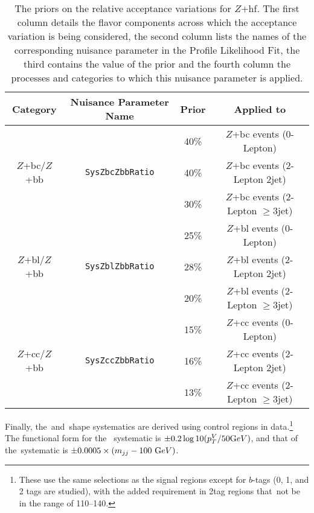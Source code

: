 \begin{table}[!htbp]\captionsetup{justification=centering}
\caption{The priors on the relative acceptance variations for $Z$+hf. The first column details the flavor components across which the acceptance variation is being considered, the second column lists the names of the corresponding nuisance parameter in the Profile Likelihood Fit, the third contains the value of the prior and the fourth column the processes and categories to which this nuisance parameter is applied.}
\begin{center}
\begin{tabular}{c|c|c|c}
        \hline
        \hline
         Category & Nuisance Parameter Name & Prior & Applied to\\ 
        \hline
        \multirow{ 3}{*}{$Z$+bc/$Z$+bb} & \multirow{ 3}{*}{\texttt{SysZbcZbbRatio}}  & 40\% & $Z$+bc events (0-Lepton)\\
                                                            &								    & 40\% & $Z$+bc events (2-Lepton 2jet)\\
							  &								    & 30\% & $Z$+bc events (2-Lepton $\geq$3jet)\\		
        \hline
        \multirow{ 3}{*}{$Z$+bl/$Z$+bb} & \multirow{ 3}{*}{\texttt{SysZblZbbRatio}}     & 25\% & $Z$+bl events (0-Lepton)\\
                                                            &								    & 28\% & $Z$+bl events (2-Lepton 2jet)\\
							  &								    & 20\% & $Z$+bl events (2-Lepton $\geq$3jet)\\	
	\hline
        \multirow{ 3}{*}{$Z$+cc/$Z$+bb} & \multirow{ 3}{*}{\texttt{SysZccZbbRatio}}    & 15\% & $Z$+cc events (0-Lepton)\\
                                                            &								    &  16\% & $Z$+cc events (2-Lepton 2jet)\\
							  &								    &   13\% & $Z$+cc events (2-Lepton $\geq$3jet)\\	
        \hline
        \hline
\end{tabular}
\label{tab:zhf}
\end{center}
\end{table}

Finally, the \ptv\,and \mbb\,shape systematics are derived using control regions in data.\footnote{These use the same selections as the signal regions except for $b$-tags (0, 1, and 2 tags are studied), with the added requirement in 2tag regions that \mbb\,not be in the range of 110--140\GeV.}  The functional form for the \ptv\, systematic is $\pm 0.2 \log10 (p_T^V/50 {\text GeV})$, and that of the \mbb \,systematic is $\pm 0.0005 \times (m_{jj}-100~{\text GeV})$.

